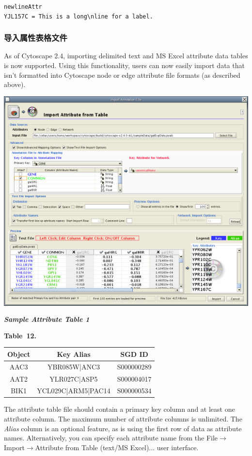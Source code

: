  \begin{verbatim}
newlineAttr
YJL157C = This is a long\nline for a label.
\end{verbatim}

\subsubsection{导入属性表格文件}

 As of Cytoscape 2.4, importing delimited text and MS Excel attribute data
tables is now supported. Using this functionality, users can now easily import
data that isn't formatted into Cytoscape node or edge attribute file formats
(as described above). 

\centerline{\includegraphics[width=.6\textwidth]{images/attribute_table_import_main.png} }

 \emph{\textbf{Sample Attribute Table 1} }

 \textbf{Table 12. }

\begin{tabular}{|c|c|c|}
\hline 
 Object& Key Alias& SGD ID\\
\hline
 AAC3 &YBR085W|ANC3& S000000289\\
 AAT2 &YLR027C|ASP5& S000004017\\
 BIK1 & YCL029C|ARM5|PAC14 &S000000534\\
 \hline 
\end{tabular}

 The attribute table file should contain a primary key column and at least one
attribute column. The maximum number of attribute columns is unlimited. The
\emph{Alias} column is an optional feature, as is using the first row of data
as attribute names. Alternatively, you can specify each attribute name from the
File$\rightarrow$Import$\rightarrow$Attribute from Table (text/MS Excel)...
user interface. 



